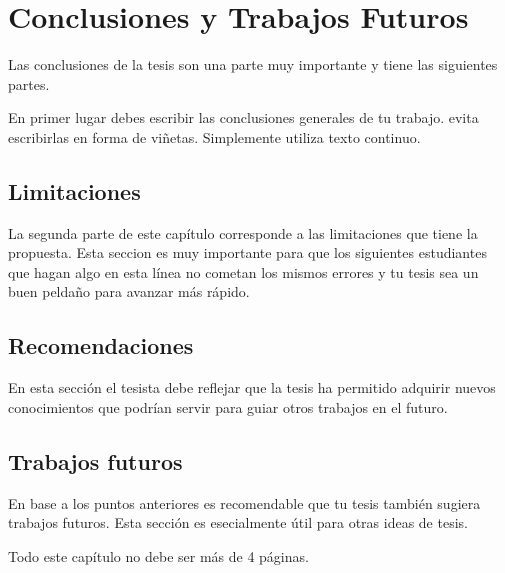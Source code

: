 \chapter{Conclusiones y Trabajos Futuros}\label{chap:conclusiones}

Las conclusiones de la tesis son una parte muy importante y tiene las siguientes partes.

En primer lugar debes escribir las conclusiones generales de tu trabajo. evita escribirlas en forma de viñetas. Simplemente utiliza texto continuo.

\section{Limitaciones}
La segunda  parte de este capítulo corresponde a las limitaciones que tiene la propuesta. Esta seccion es muy importante para que los siguientes estudiantes que hagan algo en esta línea no cometan los mismos errores y tu tesis sea un buen peldaño para avanzar más rápido.

\section{Recomendaciones}
En esta sección el tesista debe reflejar que la tesis ha permitido adquirir nuevos conocimientos que podrían servir para guiar otros trabajos en el futuro.

\section{Trabajos futuros}
En base a los puntos anteriores es recomendable que tu tesis también sugiera trabajos futuros. Esta sección es esecialmente útil para otras ideas de tesis.

Todo este capítulo no debe ser más de 4 páginas.